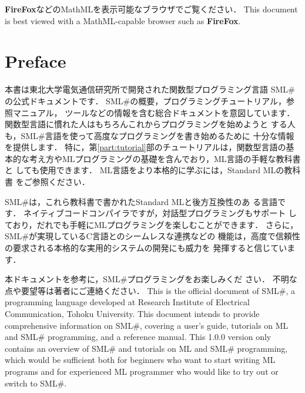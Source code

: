 \documentclass{jbook}
\date{\today}
\title{\txt{プログラミング言語\smlsharp{}解説}{\smlsharp{} Document}}
\author{
\authors
\\
\txt{東北大学 電気通信研究所}{RIEC, Tohoku University}
}
\newcommand{\txt}[2]{#2}
\newcommand{\smlsharp}{SML\#}
\newcommand{\version}{1.0.0}
\begin{document}
\maketitle

\frontmatter
\ifx\jp%
{\bf FireFox}などのMathMLを表示可能なブラウザでご覧ください．
\else%
This document is best viewed with a MathML-capable browser such as {\bf FireFox}.
\fi%

\chapter*{\txt{はじめに}{Preface}}

\ifx\jp%
	本書は東北大学電気通信研究所で開発された関数型プログラミング言語
\smlsharp{}の公式ドキュメントです．
	\smlsharp{}の概要，プログラミングチュートリアル，参照マニュアル，
ツールなどの情報を含む総合ドキュメントを意図しています．
	関数型言語に慣れた人はもちろんこれからプログラミングを始めようと
する人も，\smlsharp{}言語を使って高度なプログラミングを書き始めるために
十分な情報を提供します．
	特に，第\ref{part:tutorial}部のチュートリアルは，関数型言語の基
本的な考え方やMLプログラミングの基礎を含んでおり，ML言語の手軽な教科書と
しても使用できます．
	ML言語をより本格的に学ぶには，Standard MLの教科書
\cite{ohori00sml}をご参照ください．
  
	\smlsharp{}は，これら教科書で書かれたStandard MLと後方互換性のあ
る言語です．
	ネイティブコードコンパイラですが，対話型プログラミングもサポート
しており，だれでも手軽にMLプログラミングを楽しむことができます．
	さらに，\smlsharp{}が実現しているC言語とのシームレスな連携などの
機能は，高度で信頼性の要求される本格的な実用的システムの開発にも威力を
発揮すると信じています． 
  
	本ドキュメントを参考に，\smlsharp{}プログラミングをお楽しみくだ
さい． 
	不明な点や要望等は著者にご連絡ください．
\else%
	This is the official document of \smlsharp{}, a programming
language developed at Research Institute of Electrical Communication,
Tohoku University.
	This document intends to provide comprehensive information on
\smlsharp{}, covering a user's guide, tutorials on ML and \smlsharp{}
programming, and a reference manual.
	This \version{} version only contains an overview of \smlsharp{}
and tutorials on ML and \smlsharp{} programming, which would be
sufficient both for beginners who want to start writing ML programs and
for experienced ML programmer who would like to try out or switch to
\smlsharp{}.
\end{document}

